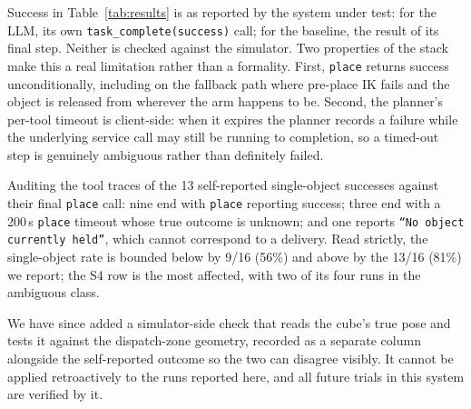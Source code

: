 Success in Table~\ref{tab:results} is as reported by the system under test:
for the LLM, its own \texttt{task\_complete(success)} call; for the
baseline, the result of its final step. Neither is checked against the
simulator. Two properties of the stack make this a real limitation rather
than a formality. First, \texttt{place} returns success unconditionally,
including on the fallback path where pre-place IK fails and the object is
released from wherever the arm happens to be. Second, the planner's per-tool
timeout is client-side: when it expires the planner records a failure while
the underlying service call may still be running to completion, so a
timed-out step is genuinely ambiguous rather than definitely failed.

Auditing the tool traces of the 13 self-reported single-object successes
against their final \texttt{place} call: nine end with \texttt{place}
reporting success; three end with a 200\,s \texttt{place} timeout whose true
outcome is unknown; and one reports \texttt{``No object currently held''},
which cannot correspond to a delivery. Read strictly, the single-object rate
is bounded below by 9/16 (56\%) and above by the 13/16 (81\%) we report;
the S4 row is the most affected, with two of its four runs in the
ambiguous class.

We have since added a simulator-side check that reads the cube's true pose
and tests it against the dispatch-zone geometry, recorded as a separate
column alongside the self-reported outcome so the two can disagree visibly.
It cannot be applied retroactively to the runs reported here, and all
future trials in this system are verified by it.

